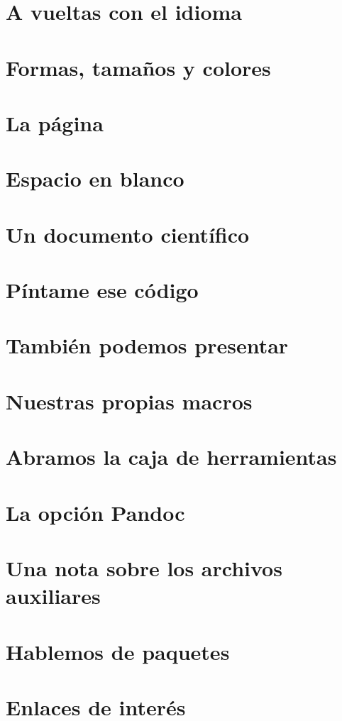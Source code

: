 \documentclass[a4paper,10pt]{book}
\begin{document}
\chapter{A vueltas con el idioma}\label{ch:idioma}


\chapter{Formas, tamaños y colores}


\chapter{La página}


\chapter{Espacio en blanco}\label{ch:blanco}


\chapter{Un documento científico}


\chapter{Píntame ese código}


\chapter{También podemos presentar}


\chapter{Nuestras propias macros}


\chapter{Abramos la caja de herramientas}


\chapter{La opción Pandoc}


\appendix
\chapter{Una nota sobre los archivos auxiliares}


\chapter{Hablemos de paquetes}


\chapter{Enlaces de interés}


\backmatter
% 
%
\end{document}
